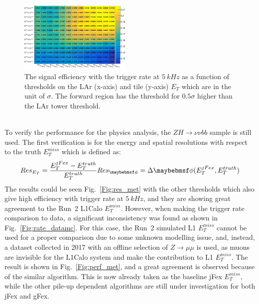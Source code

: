 \begin{figure}[!h]                
	\includegraphics[width=0.48\textwidth]{Chapter6/efficiency_5kHz_cfg1.png}
		\begin{center}
		\caption{The signal efficiency with the trigger rate at $5~kHz$ as a function of thresholds on the LAr (x-axis) and tile (y-axis) $E_{T}$ which are in the unit of $\sigma$. The forward region has the threshold for $0.5\sigma$ higher than the LAr tower threshold.}
		\label{Fig:thresold_scan_1}            
	\end{center}
\end{figure}
\noindent
\\To verify the performance for the physics analysis, the $ZH\to\nu\nu bb$ sample is still used. The first verification is for the energy and spatial resolutions with respect to the truth $E^{miss}_{T}$ which is defined as:
\begin{equation}
Res_{E_{T}} = \frac{E^{jFex}_{T}-E^{truth}_{T}}{E^{truth}_{T}} \\
Res_{\phi} = \Delta\phi(E^{jFex}_{T}, E^{truth}_{T})
\end{equation}
The results could be seen Fig.~\ref{Fig:res_met} with the other thresholds which also give high efficiency with trigger rate at $5~kHz$, and they are showing great agreement to the Run~2 L1Calo $E^{miss}_{T}$. However, when making the trigger rate comparison to data, a significant inconsistency was found as shown in Fig.~\ref{Fig:rate_datamc}. For this case, the Run~2 simulated L1 $E^{miss}_{T}$ cannot be used for a proper comparison due to some unknown modelling issue, and, instead, a dataset collected in 2017 with an offline selection of $Z\to\mu\mu$ is used, as muons are invisible for the L1Calo system and make the contribution to L1 $E^{miss}_{T}$. The result is shown in Fig.~\ref{Fig:perf_met}, and a great agreement is observed because of the similar algorithm. This is now already taken as the baseline jFex $E^{miss}_{T}$, while the other pile-up dependent algorithms are still under investigation for both jFex and gFex. 
